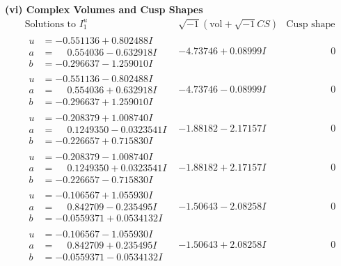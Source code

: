 \documentclass[1p]{elsarticle_modified}
\theoremstyle{definition}
\newcommand{\I}{\sqrt{-1}}
\begin{document}
\newpage\flushleft \textbf{(vi) Complex Volumes and Cusp Shapes}
$$\begin{array}{c|c|c}  
\text{Solutions to }I^u_{1}& \I (\text{vol} + \sqrt{-1}CS) & \text{Cusp shape}\\
 \hline 
\begin{aligned}
u &= -0.551136 + 0.802488 I \\
a &= \phantom{-}0.554036 - 0.632918 I \\
b &= -0.296637 - 1.259010 I\end{aligned}
 & -4.73746 + 0.08999 I & \phantom{-0.000000 } 0 \\ \hline\begin{aligned}
u &= -0.551136 - 0.802488 I \\
a &= \phantom{-}0.554036 + 0.632918 I \\
b &= -0.296637 + 1.259010 I\end{aligned}
 & -4.73746 - 0.08999 I & \phantom{-0.000000 } 0 \\ \hline\begin{aligned}
u &= -0.208379 + 1.008740 I \\
a &= \phantom{-}0.1249350 - 0.0323541 I \\
b &= -0.226657 + 0.715830 I\end{aligned}
 & -1.88182 - 2.17157 I & \phantom{-0.000000 } 0 \\ \hline\begin{aligned}
u &= -0.208379 - 1.008740 I \\
a &= \phantom{-}0.1249350 + 0.0323541 I \\
b &= -0.226657 - 0.715830 I\end{aligned}
 & -1.88182 + 2.17157 I & \phantom{-0.000000 } 0 \\ \hline\begin{aligned}
u &= -0.106567 + 1.055930 I \\
a &= \phantom{-}0.842709 - 0.235495 I \\
b &= -0.0559371 + 0.0534132 I\end{aligned}
 & -1.50643 - 2.08258 I & \phantom{-0.000000 } 0 \\ \hline\begin{aligned}
u &= -0.106567 - 1.055930 I \\
a &= \phantom{-}0.842709 + 0.235495 I \\
b &= -0.0559371 - 0.0534132 I\end{aligned}
 & -1.50643 + 2.08258 I & \phantom{-0.000000 } 0 \\ \hline\begin{aligned}

\end{aligned}
\end{array}$$
\end{document}
